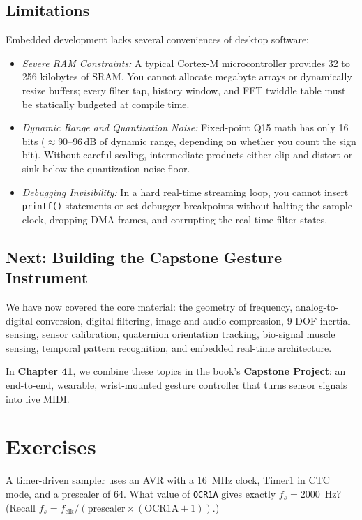 \subsection{Limitations}
Embedded development lacks several conveniences of desktop software:
\begin{itemize}
  \item \emph{Severe RAM Constraints:} A typical Cortex-M microcontroller provides 32 to 256 kilobytes of SRAM. You cannot allocate megabyte arrays or dynamically resize buffers; every filter tap, history window, and FFT twiddle table must be statically budgeted at compile time.
  \item \emph{Dynamic Range and Quantization Noise:} Fixed-point Q15 math has only 16 bits ($\approx 90$--$96\,\text{dB}$ of dynamic range, depending on whether you count the sign bit). Without careful scaling, intermediate products either clip and distort or sink below the quantization noise floor.
  \item \emph{Debugging Invisibility:} In a hard real-time streaming loop, you cannot insert \texttt{printf()} statements or set debugger breakpoints without halting the sample clock, dropping DMA frames, and corrupting the real-time filter states.
\end{itemize}

\subsection{Next: Building the Capstone Gesture Instrument}
We have now covered the core material: the geometry of frequency, analog-to-digital conversion, digital filtering, image and audio compression, 9-DOF inertial sensing, sensor calibration, quaternion orientation tracking, bio-signal muscle sensing, temporal pattern recognition, and embedded real-time architecture.

In \textbf{Chapter 41}, we combine these topics in the book's \textbf{Capstone Project}: an end-to-end, wearable, wrist-mounted gesture controller that turns sensor signals into live MIDI.

\section{Exercises}
\label{ch40:exercises}

\begin{exercise}
A timer-driven sampler uses an AVR with a $16$~MHz clock, Timer1 in CTC mode, and a prescaler of
$64$. What value of \texttt{OCR1A} gives exactly $f_s = 2000$~Hz? (Recall $f_s = f_{\text{clk}} /
(\text{prescaler}\times(\text{OCR1A}+1))$.)
\end{exercise}

